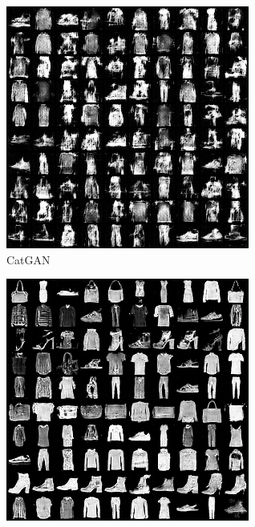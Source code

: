 \begin{figure}[htbp]
  \centering
  \begin{subfigure}[b]{\trif\textwidth}
    \includegraphics[width=\textwidth]{Img/fa-cg.png}
    \caption{CatGAN}
  \end{subfigure}
  \begin{subfigure}[b]{\trif\textwidth}
    \includegraphics[width=\textwidth]{Img/fa-icg.png}

\end{subfigure}
\end{figure}
